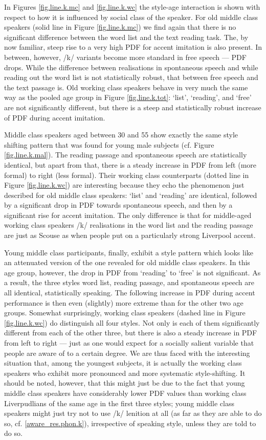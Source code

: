 In Figures \ref{fig.line.k.mc} and \ref{fig.line.k.wc} the style-age interaction is shown with respect to how it is influenced by social class of the speaker.
For old middle class speakers (solid line in Figure \ref{fig.line.k.mc}) we find again that there is no significant difference between the word list and the text reading task.
The, by now familiar, steep rise to a very high PDF for accent imitation is also present.
In between, however, /k/ variants become more standard in free speech --- PDF drops.
While the difference between realisations in spontaneous speech and while reading out the word list is not statistically robust, that between free speech and the text passage is.
Old working class speakers behave in very much the same way as the pooled age group in Figure \ref{fig.line.k.tot}: `list', `reading', and `free' are not significantly different, but there is a steep and statistically robust increase of PDF during accent imitation.

Middle class speakers aged between 30 and 55 show exactly the same style shifting pattern that was found for young male subjects (cf. Figure \ref{fig.line.k.mal}).
The reading passage and spontaneous speech are statistically identical, but apart from that, there is a steady increase in PDF from left (more formal) to right (less formal).
Their working class counterparts (dotted line in Figure \ref{fig.line.k.wc}) are interesting because they echo the phenomenon just described for old middle class speakers: `list' and `reading' are identical, followed by a significant drop in PDF towards spontaneous speech, and then by a significant rise for accent imitation.
The only difference is that for middle-aged working class speakers /k/ realisations in the word list and the reading passage are just as Scouse as when people put on a particularly strong Liverpool accent.

Young middle class participants, finally, exhibit a style pattern which looks like an attenuated version of the one revealed for old middle class speakers.
In this age group, however, the drop in PDF from `reading' to `free' is not significant.
As a result, the three styles word list, reading passage, and spontaneous speech are all identical, statistically speaking.
The following increase in PDF during accent performance is then even (slightly) more extreme than for the other two age groups.
Somewhat surprisingly, working class speakers (dashed line in Figure \ref{fig.line.k.wc}) do distinguish all four styles.
Not only is each of them significantly different from each of the other three, but there is also a steady increase in PDF from left to right --- just as one would expect for a socially salient variable that people are aware of to a certain degree.
We are thus faced with the interesting situation that, among the youngest subjects, it is actually the working class speakers who exhibit more pronounced and more systematic style-shifting.
It should be noted, however, that this might just be due to the fact that young middle class speakers have considerably lower PDF values than working class Liverpudlians of the same age in the first three styles; young middle class speakers might just try not to use /k/ lenition at all (as far as they are able to do so, cf. \ref{aware_res.phon.k}), irrespective of speaking style, unless they are told to do so.